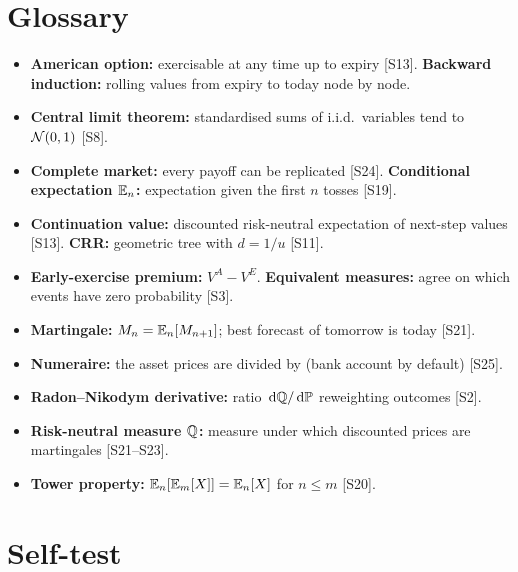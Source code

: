 \documentclass[10pt]{article}
\begin{document}
\section{Glossary}
\begin{itemize}
\item \textbf{American option:} exercisable at any time up to expiry [S13]. \quad \textbf{Backward induction:} rolling values from expiry to today node by node.
\item \textbf{Central limit theorem:} standardised sums of i.i.d.\ variables tend to $\mathcal{N}(0,1)$ [S8].
\item \textbf{Complete market:} every payoff can be replicated [S24]. \quad \textbf{Conditional expectation $\mathbb{E}_n$:} expectation given the first $n$ tosses [S19].
\item \textbf{Continuation value:} discounted risk-neutral expectation of next-step values [S13]. \quad \textbf{CRR:} geometric tree with $d=1/u$ [S11].
\item \textbf{Early-exercise premium:} $V^A-V^E$. \quad \textbf{Equivalent measures:} agree on which events have zero probability [S3].
\item \textbf{Martingale:} $M_n=\mathbb{E}_n[M_{n+1}]$; best forecast of tomorrow is today [S21].
\item \textbf{Numeraire:} the asset prices are divided by (bank account by default) [S25].
\item \textbf{Radon--Nikodym derivative:} ratio $\,\mathrm{d}\mathbb{Q}/\,\mathrm{d}\mathbb{P}$ reweighting outcomes [S2].
\item \textbf{Risk-neutral measure $\mathbb{Q}$:} measure under which discounted prices are martingales [S21--S23].
\item \textbf{Tower property:} $\mathbb{E}_n[\mathbb{E}_m[X]]=\mathbb{E}_n[X]$ for $n\le m$ [S20].
\end{itemize}

\section{Self-test}
\end{document}
